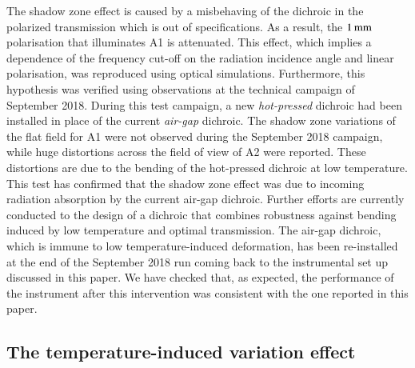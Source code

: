 The shadow zone effect is caused by {\lp a misbehaving of the dichroic in
the polarized transmission which is out of specifications. As a
result, the $1\,\rm{mm}$ polarisation that illuminates A1 is
attenuated.}
This effect,
which implies %
{\lp a dependence of the frequency cut-off on the radiation
incidence angle and linear polarisation,}
was reproduced using optical simulations. Furthermore, this hypothesis was
verified using observations at the technical campaign of September
2018. During this test campaign, a new \emph{hot-pressed} dichroic had
been installed in place of the current \emph{air-gap} dichroic.
%
%
The shadow zone variations of the flat field for A1 were
not observed during the September 2018 campaign, while huge distortions
across the field of view of A2 were reported. These distortions are
due to the bending of the hot-pressed dichroic at low temperature.
This test has confirmed that the shadow zone effect was due
to incoming radiation absorption by the current air-gap dichroic.
Further efforts are currently conducted to the design of a dichroic that
combines robustness against bending induced by low temperature and
optimal transmission.
{\lp The air-gap dichroic, which is immune to low temperature-induced
deformation, has been re-installed at the end of the September 2018
run coming back to the instrumental set up discussed in this paper. We
have checked that, as expected, the performance of the instrument
after this intervention was consistent with the one reported in this
paper.}


\subsection{The temperature-induced variation effect}
\label{se:beam_variation}

